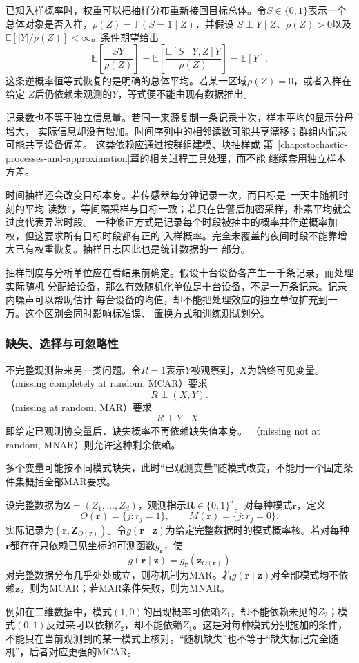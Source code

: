 已知入样概率时，权重可以把抽样分布重新接回目标总体。令\(S\in\{0,1\}\)表示一个
总体对象是否入样，\(\rho(Z)=\mathbb{P}(S=1\mid Z)\)，并假设
\(S\mathrel{\perp}Y\mid Z\)、\(\rho(Z)>0\)以及
\(\mathbb{E}[|Y|/\rho(Z)]<\infty\)。条件期望给出
\[
  \mathbb{E}\left[\frac{SY}{\rho(Z)}\right]
  =\mathbb{E}\left[
    \frac{\mathbb{E}[S\mid Y,Z]Y}{\rho(Z)}
  \right]
  =\mathbb{E}[Y].
\]
这条逆概率恒等式恢复的是明确的总体平均。若某一区域\(\rho(Z)=0\)，或者入样在给定
\(Z\)后仍依赖未观测的\(Y\)，等式便不能由现有数据推出。

记录数也不等于独立信息量。若同一来源复制一条记录十次，样本平均的显示分母增大，
实际信息却没有增加。时间序列中的相邻读数可能共享漂移；群组内记录可能共享设备偏差。
这类依赖应通过按群组建模、块抽样或
第~\ref{chap:stochastic-processes-and-approximation}章的相关过程工具处理，而不能
继续套用独立样本方差。

时间抽样还会改变目标本身。若传感器每分钟记录一次，而目标是“一天中随机时刻的平均
读数”，等间隔采样与目标一致；若只在告警后加密采样，朴素平均就会过度代表异常时段。
一种修正方式是记录每个时段被抽中的概率并作逆概率加权，但这要求所有目标时段都有正的
入样概率。完全未覆盖的夜间时段不能靠增大已有权重恢复。抽样日志因此也是统计数据的一
部分。

抽样制度与分析单位应在看结果前确定。假设十台设备各产生一千条记录，而处理实际随机
分配给设备，那么有效随机化单位是十台设备，不是一万条记录。记录内噪声可以帮助估计
每台设备的均值，却不能把处理效应的独立单位扩充到一万。这个区别会同时影响标准误、
置换方式和训练测试划分。

\subsubsection{缺失、选择与可忽略性}
\label{sec:statistics-missingness-observation}

不完整观测带来另一类问题。令\(R=1\)表示\(Y\)被观察到，\(X\)为始终可见变量。
（missing completely at random, MCAR）要求
\[
  R\mathrel{\perp}(X,Y).
\]
（missing at random, MAR）要求
\[
  R\mathrel{\perp}Y\mid X,
\]
即给定已观测协变量后，缺失概率不再依赖缺失值本身。
（missing not at random, MNAR）则允许这种剩余依赖。

多个变量可能按不同模式缺失，此时“已观测变量”随模式改变，不能用一个固定条件集概括全部MAR要求。
\begin{definition}[观测模式与缺失机制]
  \label{def:statistics-missingness}
  设完整数据为\(\bm Z=(Z_1,\ldots,Z_d)\)，观测指示\(\bm R\in\{0,1\}^d\)。对每种模式\(\bm r\)，定义
  \[
    O(\bm r)=\{j:r_j=1\},\qquad M(\bm r)=\{j:r_j=0\}.
  \]
  实际记录为\((\bm r,\bm Z_{O(\bm r)})\)。令\(g(\bm r\mid\bm z)\)为给定完整数据时的模式概率核。若对每种\(\bm r\)都存在只依赖已见坐标的可测函数\(g_{\bm r}\)，使
  \[
    g(\bm r\mid\bm z)=g_{\bm r}(\bm z_{O(\bm r)})
  \]
  对完整数据分布几乎处处成立，则称机制为MAR。若\(g(\bm r\mid\bm z)\)对全部模式均不依赖\(\bm z\)，则为MCAR；若MAR条件失败，则为MNAR。
\end{definition}
例如在二维数据中，模式\((1,0)\)的出现概率可依赖\(Z_1\)，却不能依赖未见的\(Z_2\)；模式\((0,1)\)反过来可以依赖\(Z_2\)，却不能依赖\(Z_1\)。这是对每种模式分别施加的条件，不能只在当前观测到的某一模式上核对。“随机缺失”也不等于“缺失标记完全随机”，后者对应更强的MCAR。

